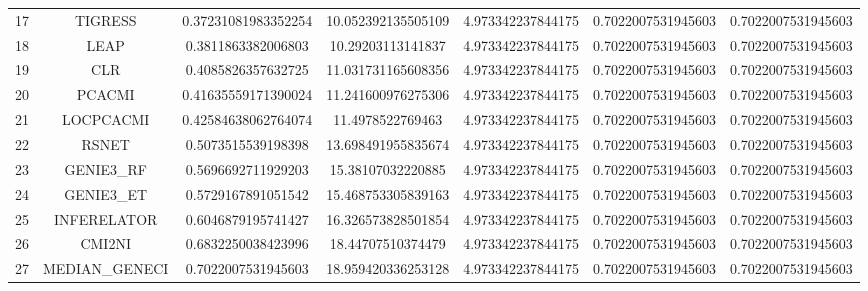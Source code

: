 \documentclass[a4paper,10pt]{article}
\begin{document}
\begin{landscape}
\begin{table}[!htp]
\begin{tabular}{ccccccc}
17&TIGRESS&0.37231081983352254&10.052392135505109&4.973342237844175&0.7022007531945603&0.7022007531945603\\
18&LEAP&0.3811863382006803&10.29203113141837&4.973342237844175&0.7022007531945603&0.7022007531945603\\
19&CLR&0.4085826357632725&11.031731165608356&4.973342237844175&0.7022007531945603&0.7022007531945603\\
20&PCACMI&0.41635559171390024&11.241600976275306&4.973342237844175&0.7022007531945603&0.7022007531945603\\
21&LOCPCACMI&0.42584638062764074&11.4978522769463&4.973342237844175&0.7022007531945603&0.7022007531945603\\
22&RSNET&0.5073515539198398&13.698491955835674&4.973342237844175&0.7022007531945603&0.7022007531945603\\
23&GENIE3_RF&0.5696692711929203&15.38107032220885&4.973342237844175&0.7022007531945603&0.7022007531945603\\
24&GENIE3_ET&0.5729167891051542&15.468753305839163&4.973342237844175&0.7022007531945603&0.7022007531945603\\
25&INFERELATOR&0.6046879195741427&16.326573828501854&4.973342237844175&0.7022007531945603&0.7022007531945603\\
26&CMI2NI&0.6832250038423996&18.44707510374479&4.973342237844175&0.7022007531945603&0.7022007531945603\\
27&MEDIAN_GENECI&0.7022007531945603&18.959420336253128&4.973342237844175&0.7022007531945603&0.7022007531945603\\
\hline
\end{tabular}
\end{table}


\end{landscape}
\end{document}
